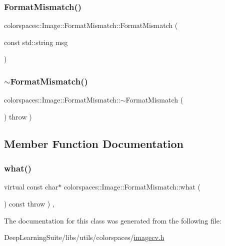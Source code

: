 \subsubsection{\texorpdfstring{Format\+Mismatch()}{FormatMismatch()}}
{\footnotesize\ttfamily colorspaces\+::\+Image\+::\+Format\+Mismatch\+::\+Format\+Mismatch (\begin{DoxyParamCaption}\item[{const std\+::string}]{msg }\end{DoxyParamCaption})\hspace{0.3cm}{\ttfamily [inline]}}

\mbox{\label{classcolorspaces_1_1_image_1_1_format_mismatch_aaf8f52b425f244849b8b84d384eef961}} 
\subsubsection{\texorpdfstring{$\sim$\+Format\+Mismatch()}{~FormatMismatch()}}
{\footnotesize\ttfamily colorspaces\+::\+Image\+::\+Format\+Mismatch\+::$\sim$\+Format\+Mismatch (\begin{DoxyParamCaption}{ }\end{DoxyParamCaption}) throw  ) \hspace{0.3cm}{\ttfamily [inline]}}



\subsection{Member Function Documentation}
\mbox{\label{classcolorspaces_1_1_image_1_1_format_mismatch_ab8255b66f6ed6b5034155e0132654f01}} 
\subsubsection{\texorpdfstring{what()}{what()}}
{\footnotesize\ttfamily virtual const char$\ast$ colorspaces\+::\+Image\+::\+Format\+Mismatch\+::what (\begin{DoxyParamCaption}{ }\end{DoxyParamCaption}) const throw  ) \hspace{0.3cm}{\ttfamily [inline]}, {\ttfamily [virtual]}}



The documentation for this class was generated from the following file\+:\begin{DoxyCompactItemize}
\item 
Deep\+Learning\+Suite/libs/utils/colorspaces/\hyperlink{imagecv_8h}{imagecv.\+h}\end{DoxyCompactItemize}
